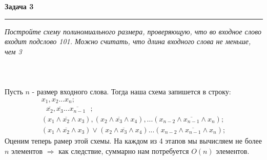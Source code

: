 \documentclass[11pt,a4paper]{scrartcl}
\begin{document}
\newpage
 

\textbf{\Large Задача 3}
\medskip\hrule\medskip 
\textsl{Постройте схему полиномиального размера, проверяющую, что во входное слово входит подслово 101. Можно считать, что длина входного слова не меньше, чем 3} \\ \\
 \\ \\
Пусть  $ n $ - размер входного слова.
Тогда наша схема запишется в строку:
\begin{align*}

	x_1, x_2 ... x_n; \\
	\textit{ }\overline{x_2}, \overline{x_3} ... \overline{x_{n - 1}}\textit{ }; \\
	(x_1 \land \overline{x_2} \land x_3), (x_2 \land \overline{x_3} \land x_4), ... (x_{n - 2} \land \overline{x_{n - 1}} \land x_{n}); \\
	(x_1 \land \overline{x_2} \land x_3) \lor (x_2 \land \overline{x_3} \land x_4) ... (x_{n - 2} \land \overline{x_{n - 1}} \land x_{n});
\end{align*}
Оценим теперь рамер этой схемы. На каждом из 4 этапов мы вычисляем не более $ n $ элементов $ \Rightarrow $  как следствие, суммарно нам потребуется $ O(n) $ элементов.
\\ \\ \\
\end{document}
